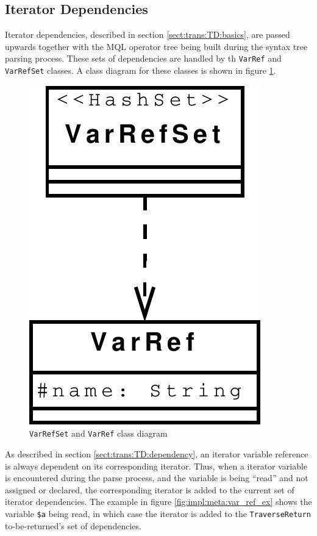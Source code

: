 \subsection{Iterator Dependencies}
Iterator dependencies, described in section \ref{sect:trans:TD:basics}, are
passed upwards together with the MQL operator tree being built during the syntax
tree parsing process. These sets of dependencies are handled by th \texttt{VarRef} and \texttt{VarRefSet} classes.
A class diagram for these classes is shown in figure \ref{fig:impl:meta:varrefset_uml}.

\begin{figure}[!htp]
\begin{center}
  \includegraphics[scale=0.5]{diagrams/varrefset_uml}
  \caption{\texttt{VarRefSet} and \texttt{VarRef} class diagram}
  \label{fig:impl:meta:varrefset_uml}
\end{center}
\end{figure}

As described in section \ref{sect:trans:TD:dependency}, an iterator variable reference is always dependent on
its corresponding iterator. Thus, when a iterator variable is encountered during the parse process, and the
variable is being ``read'' and not assigned or declared, the corresponding iterator is added to the current set of
iterator dependencies. The example in figure \ref{fig:impl:meta:var_ref_ex} shows the variable \texttt{\$a}
being read, in which case the iterator is added to the \texttt{TraverseReturn}
to-be-returned's set of dependencies.

